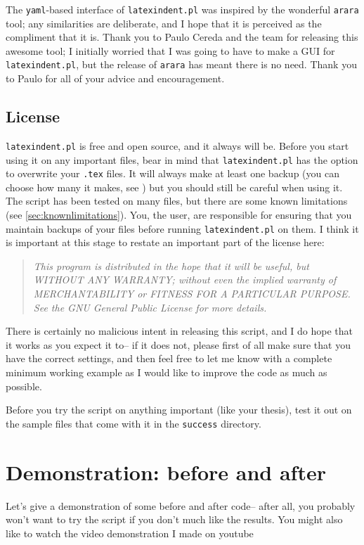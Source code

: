 The \lstinline!yaml!-based interface of \lstinline!latexindent.pl! was inspired 
by the wonderful \lstinline!arara! tool; any similarities are deliberate, and 
I hope that it is perceived as the compliment that it is. Thank you to Paulo Cereda and the 
team for releasing this awesome tool; I initially worried that I was going to 
have to make a GUI for \lstinline!latexindent.pl!, but the release of \lstinline!arara! 
has meant there is no need. Thank you to Paulo for all of your advice and 
encouragement.
 	 	 	 	 	
\subsection{License}
\lstinline!latexindent.pl! is free and open source, and it always will be.
Before you start using it on any important files, bear in mind that \lstinline!latexindent.pl! has the option to overwrite your \lstinline!.tex! files.
It will always make at least one backup (you can choose how many it makes, see )
but you should still be careful when using it. The script has been tested on many
files, but there are some known limitations (see \cref{sec:knownlimitations}). 
You, the user, are responsible for ensuring that you maintain backups of your files
before running \lstinline!latexindent.pl! on them. I think it is important at this
stage to restate an important part of the license here:
\begin{quote}\itshape
	This program is distributed in the hope that it will be useful,
	but WITHOUT ANY WARRANTY; without even the implied warranty of
	MERCHANTABILITY or FITNESS FOR A PARTICULAR PURPOSE.  See the
	GNU General Public License for more details.
\end{quote}
There is certainly no malicious intent in releasing this script, and I do hope
that it works as you expect it to-- if it does not, please first of all 
make sure that you have the correct settings, and then feel free to let me know with a 
complete minimum working example as I would like to improve the code as much as possible. 
 	 	 	 	 	
\begin{warning}
	Before you try the script on anything important (like your thesis), test it 
	out on the sample files that come with it in the \lstinline!success! directory. 
\end{warning}
 	 	 	 	 
 	 	 	 	 	
\section{Demonstration: before and after}
Let's give a demonstration of some before and after code-- after all, you probably
won't want to try the script if you don't much like the results. You might also 
like to watch the video demonstration I made on youtube \cite{cmh:videodemo}
     
